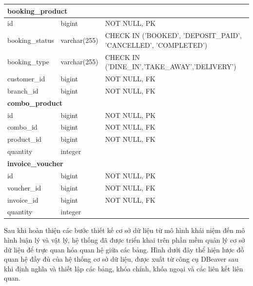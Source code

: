\begin{longtable}{|p{3.5cm}|p{3.5cm}|p{7.5cm}|}
\multicolumn{3}{|l|}{\textbf{booking\_product}} \\
\hline
id & bigint & NOT NULL, PK \\
booking\_status & varchar(255) & CHECK IN ('BOOKED', 'DEPOSIT\_PAID', 'CANCELLED', 'COMPLETED') \\
booking\_type & varchar(255) & CHECK IN ('DINE\_IN','TAKE\_AWAY','DELIVERY') \\
customer\_id & bigint & NOT NULL, FK \\
branch\_id & bigint & NOT NULL, FK \\
\hline

\multicolumn{3}{|l|}{\textbf{combo\_product}} \\
\hline
id & bigint & NOT NULL, PK \\
combo\_id & bigint & NOT NULL, FK \\
product\_id & bigint & NOT NULL, FK \\
quantity & integer & \\
\hline

\multicolumn{3}{|l|}{\textbf{invoice\_voucher}} \\
\hline
id & bigint & NOT NULL, PK \\
voucher\_id & bigint & NOT NULL, FK \\
invoice\_id & bigint & NOT NULL, FK \\
quantity & integer & \\
\hline
\end{longtable}

Sau khi hoàn thiện các bước thiết kế cơ sở dữ liệu từ mô hình khái niệm đến mô hình luận lý và vật lý, hệ thống đã được triển khai trên phần mềm quản lý cơ sở dữ liệu để trực quan hóa quan hệ giữa các bảng. Hình dưới đây thể hiện lược đồ quan hệ đầy đủ của hệ thống cơ sở dữ liệu, được xuất từ công cụ DBeaver sau khi định nghĩa và thiết lập các bảng, khóa chính, khóa ngoại và các liên kết liên quan.

